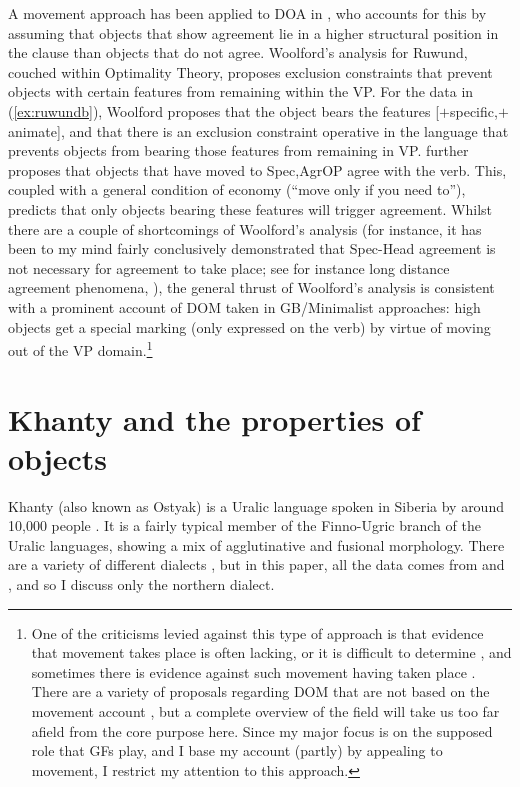 \documentclass[output=paper
,modfonts
,nonflat]{langsci/langscibook}
\begin{document}
A movement approach has been applied to DOA in \citet{woolford1999,woolford2001}, who accounts for this by assuming that objects that show agreement lie in a higher structural position in the clause than objects that do not agree.
Woolford's analysis for Ruwund, couched within Optimality Theory, proposes exclusion constraints that prevent objects with certain features from remaining within the VP.
For the data in (\ref{ex:ruwundb}), Woolford proposes that the object bears the features [$+$specific,$+$animate], and that there is an exclusion constraint operative in the language that prevents objects from bearing those features from remaining in VP.
 \citeauthor{woolford2001} further proposes that objects that have moved to Spec,AgrOP agree with the verb.
This, coupled with a general condition of economy (``move only if you need to''), predicts that only objects bearing these features will trigger agreement.
Whilst there are a couple of shortcomings of Woolford's analysis (for instance, it has been to my mind fairly conclusively demonstrated that Spec-Head agreement is not necessary for agreement to take place; see for instance long distance agreement phenomena, \citealt{polinskypotsdam2001}), the general thrust of Woolford's analysis is consistent with a prominent account of DOM taken in GB/Minimalist approaches: high objects get a special marking (only expressed on the verb) by virtue of moving out of the VP domain.\footnote{One of the criticisms levied against this type of approach is that evidence that movement takes place is often lacking, or it is difficult to determine \citep{dn2011,Baker2015}, and sometimes there is evidence against such movement having taken place \citep{kalinweisser2017}.
There are a variety of proposals regarding DOM that are not based on the movement account \citep{bossong1991,aissen2003,deswart2007,keinemuller2014,kalin2017}, but a complete overview of the field will take us too far afield from the core purpose here. Since my major focus is on the supposed role that GFs play, and I base my account (partly) by appealing to movement, I restrict my attention to this approach.}

\section{Khanty and the properties of objects}\label{Khanty}
Khanty (also known as Ostyak) is a Uralic language spoken in Siberia by around 10,000 people \citep{ethnologue}.
It is a fairly typical member of the Finno-Ugric branch of the Uralic languages, showing a mix of agglutinative and fusional morphology.
There are a variety of different dialects \citep{ostyakgrammar}, but in this paper, all the data comes from \citet{nikolaeva1999,nikolaeva2001} and \citet{dn2011}, and so I discuss only the northern dialect.
\end{document}
